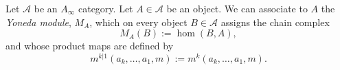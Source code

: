 
Let $\mathcal A$ be an $A_\infty$ category. Let $A\in \mathcal A$ be an object. We can associate to $A$ the \emph{Yoneda module}, $M_A$, which on every object $B\in \mathcal A$ assigns the chain complex
\[M_A(B):=\hom(B, A),\]
and whose product maps are defined by 
\[m^{k|1}(a_k, \ldots, a_1, m):= m^k(a_k, \ldots, a_1, m).\]
\label{exm:yonedaModule}
